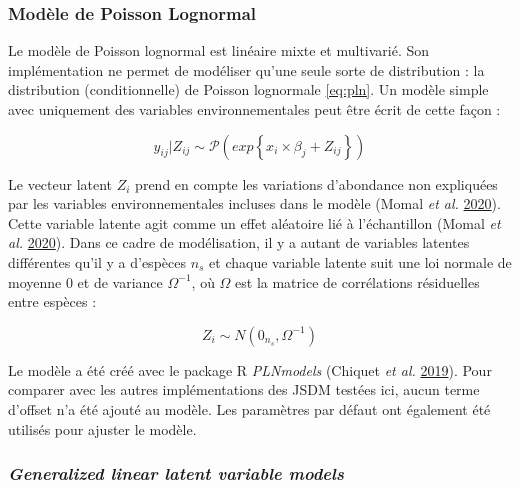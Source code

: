 \documentclass[12pt,]{article}
\begin{document}
\hypertarget{moduxe8le-de-poisson-lognormal}{%
\subsubsection{Modèle de Poisson
Lognormal}\label{moduxe8le-de-poisson-lognormal}}

Le modèle de Poisson lognormal est linéaire mixte et multivarié. Son
implémentation ne permet de modéliser qu'une seule sorte de distribution
: la distribution (conditionnelle) de Poisson lognormale \cref{eq:pln}.
Un modèle simple avec uniquement des variables environnementales peut
être écrit de cette façon :

\begin{equation}y_{ij}|Z_{ij} \sim \mathcal P\left(exp\left\{x_i \times \beta_j + Z_{ij}\right\}\right)\label{eq:pln}\end{equation}

Le vecteur latent \(Z_i\) prend en compte les variations d'abondance non
expliquées par les variables environnementales incluses dans le modèle
(Momal \emph{et al.} \protect\hyperlink{ref-Momal_2020}{2020}). Cette
variable latente agit comme un effet aléatoire lié à l'échantillon
(Momal \emph{et al.} \protect\hyperlink{ref-Momal_2020}{2020}). Dans ce
cadre de modélisation, il y a autant de variables latentes différentes
qu'il y a d'espèces \(n_s\) et chaque variable latente suit une loi
normale de moyenne 0 et de variance \(\Omega^{-1}\), où \(\Omega\) est
la matrice de corrélations résiduelles entre espèces :

\begin{equation}Z_i \sim N\left(0_{n_s}, \Omega^{-1}\right) \label{eq:constpln}\end{equation}

Le modèle a été créé avec le package R \emph{PLNmodels} (Chiquet
\emph{et al.} \protect\hyperlink{ref-Chiquet_2019}{2019}). Pour comparer
avec les autres implémentations des JSDM testées ici, aucun terme
d'offset n'a été ajouté au modèle. Les paramètres par défaut ont
également été utilisés pour ajuster le modèle.

\hypertarget{generalized-linear-latent-variable-models}{%
\subsubsection{\texorpdfstring{\emph{Generalized linear latent variable
models}}{Generalized linear latent variable models}}\label{generalized-linear-latent-variable-models}}
\end{document}
